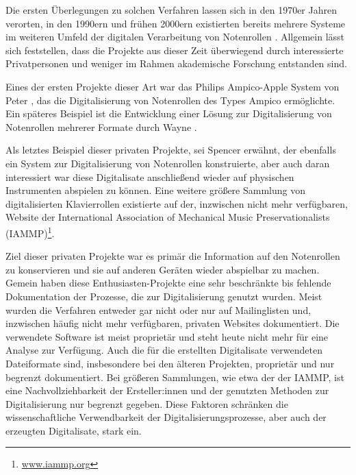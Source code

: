 Die ersten Überlegungen zu solchen Verfahren lassen sich in den 1970er Jahren verorten, in den 1990ern und frühen 2000ern existierten bereits mehrere Systeme im weiteren Umfeld der digitalen Verarbeitung von Notenrollen \parencite[63]{colmenares_2011}.
Allgemein lässt sich feststellen, dass die Projekte aus dieser Zeit überwiegend durch interessierte Privatpersonen und weniger im Rahmen akademische Forschung entstanden sind.

Eines der ersten Projekte dieser Art war das Philips Ampico-Apple System von Peter \textcite[]{stephens}, das die Digitalisierung von Notenrollen des Types Ampico ermöglichte.
Ein späteres Beispiel ist die Entwicklung einer Lösung zur Digitalisierung von Notenrollen mehrerer Formate durch Wayne \textcite[]{stahnke_1996}.

Als letztes Beispiel dieser privaten Projekte, sei Spencer \textcite[]{chase_2003} erwähnt, der ebenfalls ein System zur Digitalisierung von Notenrollen konstruierte, aber auch daran interessiert war diese Digitalisate anschließend wieder auf physischen Instrumenten abspielen zu können.
Eine weitere größere Sammlung von digitalisierten Klavierrollen existierte auf der, inzwischen nicht mehr verfügbaren, Website der International Association of Mechanical Music Preservationalists (IAMMP)\footnote{\href{http://www.iammp.org/}{www.iammp.org}}.

Ziel dieser privaten Projekte war es primär die Information auf den Notenrollen zu konservieren und sie auf anderen Geräten wieder abspielbar zu machen.
Gemein haben diese Enthusiasten-Projekte eine sehr beschränkte bis fehlende Dokumentation der Prozesse, die zur Digitalisierung genutzt wurden.
Meist wurden die Verfahren entweder gar nicht oder nur auf Mailinglisten und, inzwischen häufig nicht mehr verfügbaren, privaten Websites dokumentiert.
Die verwendete Software ist meist proprietär und steht heute nicht mehr für eine Analyse zur Verfügung.
Auch die für die erstellten Digitalisate verwendeten Dateiformate sind, insbesondere bei den älteren Projekten, proprietär und nur begrenzt dokumentiert.
Bei größeren Sammlungen, wie etwa der der IAMMP, ist eine Nachvollziehbarkeit der Ersteller:innen und der genutzten Methoden zur Digitalisierung nur begrenzt gegeben.
Diese Faktoren schränken die wissenschaftliche Verwendbarkeit der Digitalisierungsprozesse, aber auch der erzeugten Digitalisate, stark ein.

